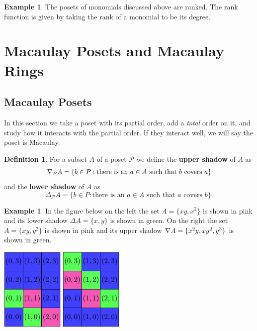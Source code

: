 \documentclass[11pt]{amsart}
\renewcommand{\P}{{\mathcal P}}
\newcommand{\dSdw}{\Delta}
\newcommand{\uSdw}{\rotatebox[origin=c]{180}{$\Delta$}}
\theoremstyle{plain} %
\theoremstyle{definition}
\newtheorem{defn}[thm]{Definition}
\newtheorem{ex}[thm]{Example}
\theoremstyle{remark}
\numberwithin{equation}{section}  %
\begin{document}
\begin{ex}
The posets of monomials discussed above are ranked. The rank function is given by taking the rank of a monomial to be its degree.
\end{ex}

\section{Macaulay Posets and Macaulay Rings} \label{s: 2}

\subsection{Macaulay Posets}
In this section we take a poset with its partial order, add  a {\em total} order on it, and study how it interacts with the partial order. If they interact well, we will say the poset is Macaulay.

\begin{tcolorbox}
\begin{defn}
For a subset $A$ of a poset $\P$ we define the {\bf upper shadow} of $A$ as
\[
\uSdw_\P A=\{b\in P : \text{there is an } a\in A \text{ such that } b \text{ covers } a\}
\]
and the {\bf lower shadow} of $A$ as
\[
\dSdw_\P A =\{b\in P :  \text{there is an } a\in A \text{ such that }  a \text{ covers } b\}.
\]
\end{defn}
\end{tcolorbox}

\begin{ex}
In the figure below on the left the set $A=\{xy,x^2\}$ is shown in pink and its lower shadow $\dSdw A=\{x,y\}$ is shown in green.  On the right  the set $A=\{xy,y^2\}$ is shown in pink and its upper shadow $\uSdw A=\{x^2y,xy^2,y^3\}$ is shown in green.
\begin{center}
	\includegraphics[height=4cm]{Pictures/2D_lower_shadow_set.pdf}
	\qquad 
	\includegraphics[height=4cm]{Pictures/2D_upper_shadow_set.pdf}
\end{center}
\end{ex}
\end{document}
